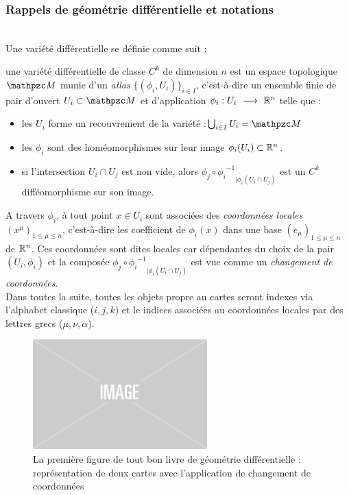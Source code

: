 \subsubsection{\wip Rappels de géométrie différentielle et notations}\label{subsec:rappel2geo_diff}

\\

Une variété différentielle se définie comme suit :
\begin{definition} \label{defvarietoche}
	une variété différentielle de classe $C^k$ de dimension $n$ est un espace topologique
	$\manu$ munie d'un \emph{atlas} $\big\{ (\phi_i, U_i) \big\}_{i\in I}$, c'est-à-dire un ensemble finie de pair d'ouvert $U_i\subset \manu$ et d'application $\phi_i :U_i\ \longrightarrow\ \mathbb{R}^n$ telle que :
	\begin{itemize}
		
		\item les $U_i$ forme un recouvrement de la variété :\qquad $\bigcup_{i\in I} U_i = \manu$
		
		\item les $\phi_i$ sont des homéomorphismes sur leur image $\phi_i(U_i)\subset\mathbb{R}^n$.
		
		\item si l'intersection $U_i \cap U_j$ est non vide, alors ${\phi_j \circ {\phi_i}^{-1}}_{| {\phi_i}(U_i\cap U_j)}$ est un $C^k$ difféomorphisme sur son image.
		
	\end{itemize}
	A travers $\phi_i$, à tout point $x\in U_i$ sont associées des \emph{coordonnées locales} $(x^\mu)_{1\leq \mu\leq n}$, c'est-à-dire les coefficient de $\phi_i(x)$ dans une base $(e_\mu)_{1\leq \mu\leq n}$ de $\mathbb{R}^n$. Ces coordonnées sont dites locales car dépendantes du choix de la pair $(U_i,\phi_i)$ et la composée ${\phi_j \circ {\phi_i}^{-1}}_{| {\phi_i}(U_i\cap U_j)}$ est vue comme un \emph{changement de coordonnées}.\\
	Dans toutes la suite, toutes les objets propre au cartes seront indexes via l'alphabet classique ($i,j,k$) et le indices associées au coordonnées locales par des lettres grecs ($\mu,\nu,\alpha$).
\end{definition}

\begin{figure}[h]
	\includegraphics[width=0.6\textwidth]{fig/placeholder}
	\caption[La première figure de tout bon livre de géométrie différentielle]{La première figure de tout bon livre de géométrie différentielle : représentation de deux cartes avec l'application de changement de coordonnées}
\end{figure}

